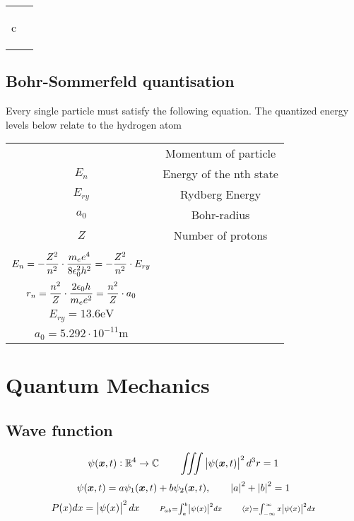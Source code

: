 \documentclass{article}
\begin{document}
\begin{twocolumn}
\begin{donotbrake}
\begin{tabular}{cc}
\begin{mtabular}{c}
	\end{mtabular}
\end{tabular}
\end{donotbrake}

\subsection{Bohr-Sommerfeld quantisation}

Every single particle must satisfy the following equation. The quantized energy levels below relate to the hydrogen atom

\begin{tabular}{cc}
	\begin{dtabular}
		$p$ & Momentum of particle \\
		$E_n$ & Energy of the nth state \\
		$E_{ry}$ & Rydberg Energy \\
		$a_0$ & Bohr-radius \\
		$Z$ & Number of protons \\	
	\end{dtabular} &
	\begin{mtabular}{c}
		$\fmm \int_{length} p \cdot ds = n \cdot h \qquad n \in \mathbb{N}$ \\
		$\displaystyle E_n = -\frac{Z^2}{n^2} \cdot \frac{m_e e^4}{8 \epsilon_0^2 h^2} = - \frac{Z^2}{n^2} \cdot E_{ry} $ \\
		$\displaystyle r_n = \frac{n^2}{Z} \cdot \frac{2 \epsilon_0 h}{m_e e^2} = \frac{n^2}{Z} \cdot a_0$ \\
		$E_{ry} = 13.6 \si{\electronvolt}$ \\
		$a_0 = 5.292 \cdot 10^{-11} \si{\meter}$
	\end{mtabular}
\end{tabular}

\section{Quantum Mechanics}

\begin{donotbrake}
\subsection{Wave function}
$$\psi(\bm{x}, t): \mathbb{R}^4 \rightarrow \mathbb{C} \qquad \iiint \left| \psi(\bm{x},t) \right|^2 d^3r = 1 $$
$$\psi(\bm{x}, t) = a \psi_1(\bm{x},t) + b \psi_2(\bm{x}, t), \qquad \left| a \right|^2 + \left| b \right|^2 = 1$$
$$P(x)dx=\left| \psi (x) \right|^2dx \qquad \scriptstyle{P_{ab}=\int_{a}^{b}\left| \psi (x) \right|^2dx \qquad \langle x\rangle=\int_{-\infty}^{\infty}x\left| \psi (x) \right|^2dx}$$
\end{donotbrake}


\end{twocolumn}
\end{document}
